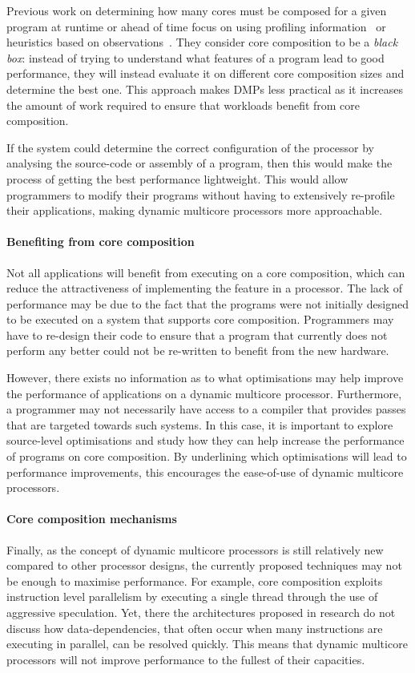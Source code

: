 Previous work on determining how many cores must be composed for a given program at runtime or ahead of time focus on using profiling information~\cite{pricopiSchedCoreComp2014} or heuristics based on observations~\cite{gulati2008multitaskingdmc}.
They consider core composition to be a \textit{black box}: instead of trying to understand what features of a program lead to good performance, they will instead evaluate it on different core composition sizes and determine the best one.
This approach makes DMPs less practical as it increases the amount of work required to ensure that workloads benefit from core composition.

If the system could determine the correct configuration of the processor by analysing the source-code or assembly of a program, then this would make the process of getting the best performance lightweight.
This would allow programmers to modify their programs without having to extensively re-profile their applications, making dynamic multicore processors more approachable.

\paragraph*{Benefiting from core composition}
Not all applications will benefit from executing on a core composition, which can reduce the attractiveness of implementing the feature in a processor.
The lack of performance may be due to the fact that the programs were not initially designed to be executed on a system that supports core composition.
Programmers may have to re-design their code to ensure that a program that currently does not perform any better could not be re-written to benefit from the new hardware.

However, there exists no information as to what optimisations may help improve the performance of applications on a dynamic multicore processor.
Furthermore, a programmer may not necessarily have access to a compiler that provides passes that are targeted towards such systems.
In this case, it is important to explore source-level optimisations and study how they can help increase the performance of programs on core composition.
By underlining which optimisations will lead to performance improvements, this encourages the ease-of-use of dynamic multicore processors.

\paragraph*{Core composition mechanisms} 
Finally, as the concept of dynamic multicore processors is still relatively new compared to other processor designs, the currently proposed techniques may not be enough to maximise performance.
For example, core composition exploits instruction level parallelism by executing a single thread through the use of aggressive speculation.
Yet, there the architectures proposed in research do not discuss how data-dependencies, that often occur when many instructions are executing in parallel, can be resolved quickly.
This means that dynamic multicore processors will not improve performance to the fullest of their capacities.

